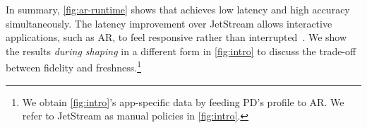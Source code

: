 
In summary, \autoref{fig:ar-runtime} shows that \sysname{} achieves low latency
and high accuracy simultaneously. The latency improvement over JetStream allows
interactive applications, such as AR, to feel responsive rather than
interrupted~\cite{nielsen1994usability}. We show the results \textit{during
  shaping} in a different form in \autoref{fig:intro} to discuss the trade-off
between fidelity and freshness.\footnote{We obtain \autoref{fig:intro}'s
  app-specific data by feeding PD's profile to AR. We refer to JetStream as
  manual policies in \autoref{fig:intro}.}

